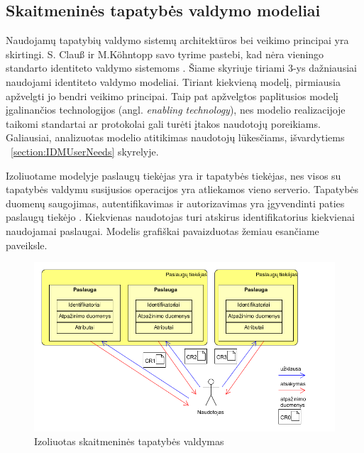 \subsection{Skaitmeninės tapatybės valdymo modeliai}

Naudojamų tapatybių valdymo sistemų architektūros bei veikimo principai yra skirtingi. S. Clauß ir M.Köhntopp savo tyrime pastebi,
kad nėra vieningo standarto identiteto valdymo sistemoms \cite{Claus2001}. Šiame skyriuje tiriami 3-ys dažniausiai naudojami identiteto valdymo
modeliai. Tiriant kiekvieną modelį, pirmiausia apžvelgti jo bendri veikimo principai. Taip pat apžvelgtos paplitusios modelį įgalinančios technologijos
(angl. \textit{enabling technology}),
nes modelio realizacijoje taikomi standartai ar protokolai gali turėti įtakos naudotojų poreikiams. Galiausiai, analizuotas modelio atitikimas naudotojų lūkesčiams,
išvardytiems \hypertarget{section:IDMUserNeeds}{~\ref{section:IDMUserNeeds}} skyrelyje.



Izoliuotame modelyje paslaugų tiekėjas yra ir tapatybės tiekėjas, nes visos su tapatybės valdymu
susijusios operacijos yra atliekamos vieno serverio. Tapatybės duomenų saugojimas, autentifikavimas
ir autorizavimas yra įgyvendinti paties paslaugų tiekėjo \cite{Cao2010}. Kiekvienas naudotojas turi atskirus identifikatorius
kiekvienai naudojamai paslaugai. Modelis grafiškai pavaizduotas žemiau esančiame paveiksle.

\begin{figure}[H]
    \centering
    \includegraphics[scale=0.65]{img/IsolatedModel}
    \caption{Izoliuotas skaitmeninės tapatybės valdymas \cite{Cao2010}}
\end{figure}

